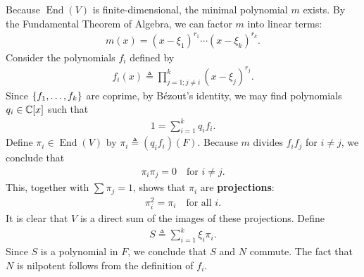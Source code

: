 \documentclass{report}
\begin{document}
\begin{mdframed}
Because \( \operatorname{End}(V) \) is finite-dimensional, the minimal polynomial \( m \) exists. By the Fundamental Theorem of Algebra, we can factor \( m \) into linear terms:
\begin{align*}
m(x) = (x - \xi_1)^{r_1} \cdots (x - \xi_k)^{r_k}.
\end{align*}
Consider the polynomials \( f_i \) defined by
\begin{align*}
f_i(x) \triangleq \prod_{j=1;j\neq i}^{k} (x - \xi_j)^{r_j}.
\end{align*}
Since \( \{ f_1, \dots, f_k \} \) are coprime, by Bézout's identity, we may find polynomials \( q_i \in \mathbb{C}[x] \) such that
\begin{align*}
1 = \sum_{i=1}^{k} q_i f_i.
\end{align*}
Define \( \pi_i \in \operatorname{End}(V) \) by \( \pi_i \triangleq (q_i f_i)(F) \). Because \( m \) divides \( f_i f_j \) for \( i \neq j \), we conclude that
\begin{align*}
\pi_i \pi_j = 0 \quad \text{for } i \neq j.
\end{align*}
This, together with \( \sum \pi_j = 1 \), shows that \( \pi_i \) are \textbf{projections}:
\begin{align*}
\pi_i^2 = \pi_i \quad \text{for all } i.
\end{align*}
It is clear that \( V \) is a direct sum of the images of these projections. Define
\begin{align*}
S \triangleq \sum_{i=1}^{k} \xi_i \pi_i.
\end{align*}
Since \( S \) is a polynomial in \( F \), we conclude that \( S \) and \( N \) commute. The fact that \( N \) is nilpotent follows from the definition of \( f_i \).
\end{mdframed}
\end{document}
